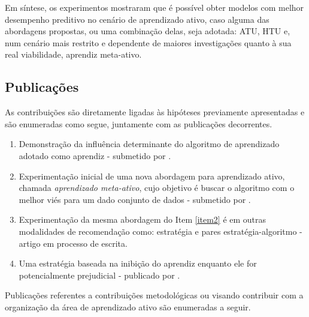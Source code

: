 Em síntese, os experimentos mostraram que é possível obter modelos com melhor desempenho preditivo no cenário de aprendizado ativo, caso alguma das abordagens propostas, ou uma combinação delas, seja adotada: ATU, HTU e, num cenário mais restrito e dependente de maiores investigações quanto à sua real viabilidade, aprendiz meta-ativo.

\subsection{Publicações}\label{intropub}
As contribuições são diretamente ligadas às hipóteses previamente apresentadas e são enumeradas como segue, juntamente com as publicações decorrentes.
\begin{enumerate}
	\item \label{item1} Demonstração da influência determinante do algoritmo de aprendizado adotado como aprendiz - submetido por .
	\item \label{item2} Experimentação inicial de uma nova abordagem para aprendizado ativo,  chamada \textit{aprendizado meta-ativo}, cujo objetivo é buscar o algoritmo com o melhor viés para um dado conjunto de dados - submetido por .
	\item Experimentação da mesma abordagem do Item \ref{item2} é em outras modalidades de recomendação como: estratégia e pares estratégia-algoritmo - artigo em processo de escrita.
	\item \label{item4} Uma estratégia baseada na inibição do aprendiz enquanto ele for potencialmente prejudicial - publicado por .
\end{enumerate}
Publicações referentes a contribuições metodológicas ou visando contribuir com a organização da área de aprendizado ativo são enumeradas a seguir.

